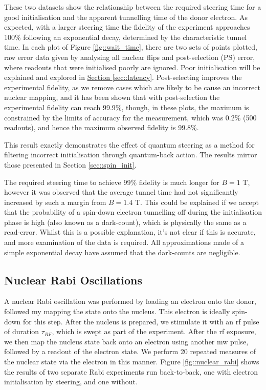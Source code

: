 	These two datasets show the relationship between the required steering time for a good initialisation and the apparent tunnelling time of the donor electron. As expected, with a larger steering time the fidelity of the experiment approaches 100\% following an exponential decay, determined by the characteristic tunnel time. In each plot of Figure \ref{fig::wait_time}, there are two sets of points plotted, raw error data given by analysing all nuclear flips and post-selection (PS) error, where readouts that were initialised poorly are ignored. Poor initialisation will be explained and explored in \hyperref[sec::latency]{Section \ref{sec::latency}}. Post-selecting improves the experimental fidelity, as we remove cases which are likely to be cause an incorrect nuclear mapping, and it has been shown that with post-selection the experimental fidelity can reach 99.9\%, though, in these plots, the maximum is constrained by the limits of accuracy for the measurement, which was 0.2\% (500 readouts), and hence the maximum observed fidelity is 99.8\%. %

	This result exactly demonstrates the effect of quantum steering as a method for filtering incorrect initialisation through quantum-back action. The results mirror those presented in Section \ref{sec::spin_init}.
	
	The required steering time to achieve 99\% fidelity is much longer for $B = 1$ T, however it was observed that the average tunnel time had not significantly increased by such a margin from $B = 1.4$ T. This could be explained if we accept that the probability of a spin-down electron tunnelling off during the initialisation phase is high (also known as a dark-count), which is physically the same as a read-error. Whilst this is a possible explanation, it's not clear if this is accurate, and more examination of the data is required. All approximations made of a simple exponential decay have assumed that the dark-counts are negligible.

\subsection{Nuclear Rabi Oscillations}
	A nuclear Rabi oscillation was performed by loading an electron onto the donor, followed my mapping the state onto the nucleus. This electron is ideally spin-down for this step. After the nucleus is prepared, we stimulate it with an \gls{rf} pulse of duration $\tau_{RF}$, which is swept as part of the experiment. After the \gls{rf} exposure, we then map the nucleus state back onto an electron using another \gls{mw} pulse, followed by a readout of the electron state. We perform 20 repeated measures of the nuclear state via the electron in this manner. 	Figure \ref{fig::nuclear_rabi} shows the results of two separate Rabi experiments run back-to-back, one with electron initialisation by steering, and one without.
	
